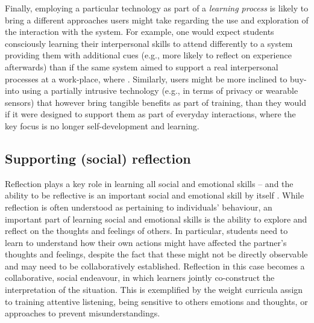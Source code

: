 \documentclass[prodmode,acmtochi]{acmsmall}
\begin{document}
 Finally, employing a particular technology as part of a \emph{learning process} is likely to bring a different approaches users might take regarding the use and exploration of the interaction with the system. For example, one would expect students consciously learning their interpersonal skills to attend differently to a system providing them with additional cues (e.g., more likely to reflect on experience afterwards) than if the same system aimed to support a real interpersonal processes at a work-place, where . Similarly, users might be more inclined to buy-into using a partially intrusive technology (e.g., in terms of privacy or wearable sensors) that however bring tangible benefits as part of training, than they would if it were designed to support them as part of everyday interactions, where the key focus is no longer self-development and learning. 
 
 
 
 

\subsection{Supporting (social) reflection}
\label{sec:socialReflection}


Reflection plays a key role in learning all social and emotional skills -- and the ability to be reflective is an important social and emotional skill by itself \cite{Cohen2001,Pasi2001}.  While reflection is often understood as pertaining to individuals' behaviour, an important part of learning social and emotional skills is the ability to explore and reflect on the thoughts and feelings of others. In particular, students need to learn to understand how their own actions might have affected the partner’s thoughts and feelings, despite the fact that these might not be directly observable and may need to be collaboratively established. Reflection in this case becomes a collaborative, social endeavour, in which learners jointly co-construct the interpretation of the situation.
This is exemplified by the weight curricula assign to training attentive listening, being sensitive to others emotions and thoughts, or approaches to prevent misunderstandings.
%
\end{document}
